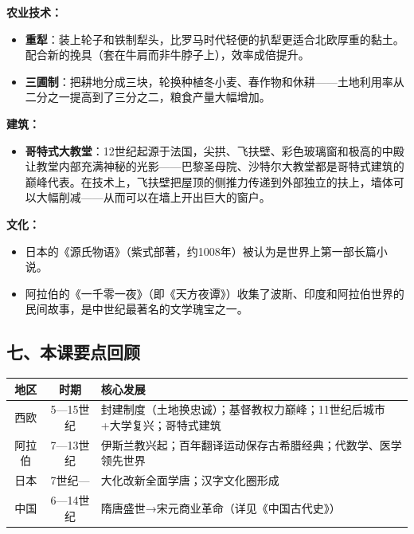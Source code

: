 \documentclass[a4paper,12pt]{ctexart}
\begin{document}
\textbf{农业技术：}
\begin{itemize}
  \item \textbf{重犁}：装上轮子和铁制犁头，比罗马时代轻便的扒犁更适合北欧厚重的黏土。配合新的挽具（套在牛肩而非牛脖子上），效率成倍提升。
  \item \textbf{三圃制}：把耕地分成三块，轮换种植冬小麦、春作物和休耕——土地利用率从二分之一提高到了三分之二，粮食产量大幅增加。
\end{itemize}

\textbf{建筑：}
\begin{itemize}
  \item \textbf{哥特式大教堂}：12世纪起源于法国，尖拱、飞扶壁、彩色玻璃窗和极高的中殿让教堂内部充满神秘的光影——巴黎圣母院、沙特尔大教堂都是哥特式建筑的巅峰代表。在技术上，飞扶壁把屋顶的侧推力传递到外部独立的扶上，墙体可以大幅削减——从而可以在墙上开出巨大的窗户。
\end{itemize}

\textbf{文化：}
\begin{itemize}
  \item 日本的《源氏物语》（紫式部著，约1008年）被认为是世界上第一部长篇小说。
  \item 阿拉伯的《一千零一夜》（即《天方夜谭》）收集了波斯、印度和阿拉伯世界的民间故事，是中世纪最著名的文学瑰宝之一。
\end{itemize}

\subsection*{七、本课要点回顾}

\begin{center}
\begin{tabular}{|c|c|p{7cm}|}
\hline
\textbf{地区} & \textbf{时期} & \textbf{核心发展} \\
\hline
西欧 & 5—15世纪 & 封建制度（土地换忠诚）；基督教权力巅峰；11世纪后城市+大学复兴；哥特式建筑 \\
\hline
阿拉伯 & 7—13世纪 & 伊斯兰教兴起；百年翻译运动保存古希腊经典；代数学、医学领先世界 \\
\hline
日本 & 7世纪— & 大化改新全面学唐；汉字文化圈形成 \\
\hline
中国 & 6—14世纪 & 隋唐盛世→宋元商业革命（详见《中国古代史》） \\
\hline
\end{tabular}
\end{center}
\end{document}
